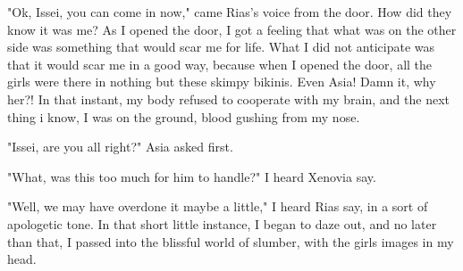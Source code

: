 \documentclass{article}
\begin{document}
"Ok, Issei, you can come in now," came Rias's voice from the door. How did they know it was me? As I opened the door, I got a feeling that what was on the other side was something that would scar me for life. What I did not anticipate was that it would scar me in a good way, because when I opened the door, all the girls were there in nothing but these skimpy bikinis. Even Asia! Damn it, why her?! In that instant, my body refused to cooperate with my brain, and the next thing i know, I was on the ground, blood gushing from my nose.

"Issei, are you all right?" Asia asked first.

"What, was this too much for him to handle?" I heard Xenovia say.

"Well, we may have overdone it maybe a little," I heard Rias say, in a sort of apologetic tone. In that short little instance, I began to daze out, and no later than that, I passed into the blissful world of slumber, with the girls images in my head.
\end{document}
